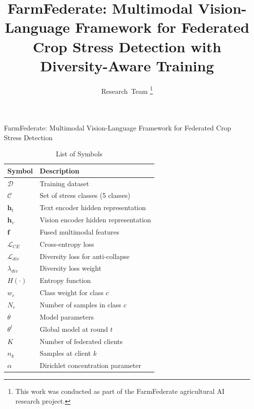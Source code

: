\documentclass[journal]{IEEEtran}
\begin{document}
\title{FarmFederate: Multimodal Vision-Language Framework for Federated Crop Stress Detection with Diversity-Aware Training}

\author{Research~Team
\thanks{This work was conducted as part of the FarmFederate agricultural AI research project.}}

{FarmFederate: Multimodal Vision-Language Framework for Federated Crop Stress Detection}

\maketitle

\begin{table}[!t]
\centering
\caption{List of Symbols}
\label{tab:symbols}
\scriptsize
\begin{tabular}{@{}ll@{}}
\toprule
\textbf{Symbol} & \textbf{Description} \\
\midrule
$\mathcal{D}$ & Training dataset \\
$\mathcal{C}$ & Set of stress classes (5 classes) \\
$\mathbf{h}_t$ & Text encoder hidden representation \\
$\mathbf{h}_v$ & Vision encoder hidden representation \\
$\mathbf{f}$ & Fused multimodal features \\
$\mathcal{L}_{CE}$ & Cross-entropy loss \\
$\mathcal{L}_{div}$ & Diversity loss for anti-collapse \\
$\lambda_{div}$ & Diversity loss weight \\
$H(\cdot)$ & Entropy function \\
$w_c$ & Class weight for class $c$ \\
$N_c$ & Number of samples in class $c$ \\
$\theta$ & Model parameters \\
$\theta^t$ & Global model at round $t$ \\
$K$ & Number of federated clients \\
$n_k$ & Samples at client $k$ \\
$\alpha$ & Dirichlet concentration parameter \\
\bottomrule
\end{tabular}
\end{table}
\end{document}
